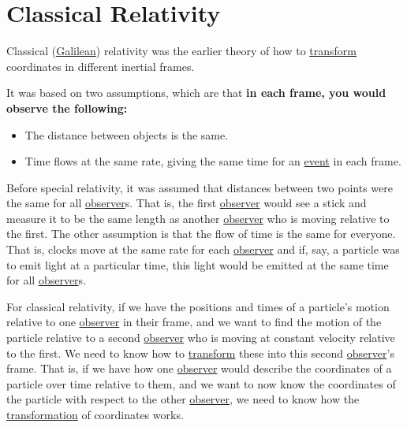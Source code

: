 \section{Classical Relativity} \label{sect: Classical Relativity}

Classical (\hyperlink{def-galilean-transform}{Galilean}) relativity was the earlier theory of how to \hyperlink{def-transform}{transform} coordinates in different inertial frames.

It was based on two assumptions, which are that \textbf{in each frame, you would observe the following:}

\begin{itemize}
	\item The distance between objects is the same.
	\item Time flows at the same rate, giving the same time for an \hyperlink{def-event}{event} in each frame.
\end{itemize}

Before special relativity, it was assumed that distances between two points were the same for all \hyperlink{def-observer}{observer}s.
That is, the first \hyperlink{def-observer}{observer} would see a stick and measure it to be the same length as another \hyperlink{def-observer}{observer} who is moving relative to the first.
The other assumption is that the flow of time is the same for everyone.
That is, clocks move at the same rate for each \hyperlink{def-observer}{observer} and if, say, a particle was to emit light at a particular time, this light would be emitted at the same time for all \hyperlink{def-observer}{observer}s.

For classical relativity, if we have the positions and times of a particle's motion relative to one \hyperlink{def-observer}{observer} in their frame, and we want to find the motion of the particle relative to a second \hyperlink{def-observer}{observer} who is moving at constant velocity relative to the first.
We need to know how to \hyperlink{def-transform}{transform} these into this second \hyperlink{def-observer}{observer}'s frame.
That is, if we have how one \hyperlink{def-observer}{observer} would describe the coordinates of a particle over time relative to them, and we want to now know the coordinates of the particle with respect to the other \hyperlink{def-observer}{observer}, we need to know how the \hyperlink{def-transform}{transformation} of coordinates works.

